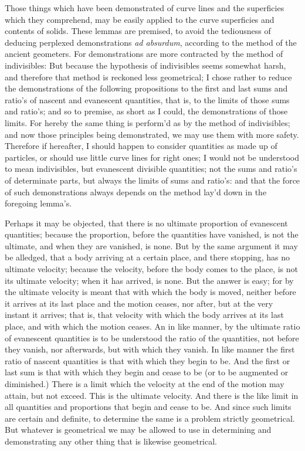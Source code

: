 Those things which have been demonstrated of curve lines and the
superficies which they comprehend, may be easily applied to the
curve superficies and contents of solids.  These lemmas are
premised, to avoid the tediousness of deducing perplexed
demonstrations {\it ad absurdum}, according to the method of the
ancient geometers.  For demonstrations are more contracted by the
method of indivisibles: But because the hypothesis of
indivisibles seems somewhat harsh, and therefore that method is
reckoned less geometrical; I chose rather to reduce the
demonstrations of the following propositions to the first and
last sums and ratio's of nascent and evanescent quantities, that
is, to the limits of those sums and ratio's; and so to premise,
as short as I could, the demonstrations of those limits.  For
hereby the same thing is perform'd as by the method of
indivisibles; and now those principles being demonstrated, we may
use them with more safety.  Therefore if hereafter, I should
happen to consider quantities as made up of particles, or should
use little curve lines for right ones; I would not be understood
to mean indivisibles, but evanescent divisible quantities; not
the sums and ratio's of determinate parts, but always the limits
of sums and ratio's: and that the force of such demonstrations
always depends on the method lay'd down in the foregoing lemma's.

Perhaps it may be objected, that there is no ultimate proportion
of evanescent quantities; because the proportion, before the
quantities have vanished, is not the ultimate, and when they are
vanished, is none.  But by the same argument it may be alledged,
that a body arriving at a certain place, and there stopping, has
no ultimate velocity; because the velocity, before the body comes
to the place, is not its ultimate velocity; when it has arrived,
is none.  But the answer is easy; for by the ultimate velocity is
meant that with which the body is moved, neither before it
arrives at its last place and the motion ceases, nor after, but
at the very instant it arrives; that is, that velocity with which
the body arrives at its last place, and with which the motion
ceases.  An in like manner, by the ultimate ratio of evanescent
quantities is to be understood the ratio of the quantities, not
before they vanish, nor afterwards, but with which they vanish.
In like manner the first ratio of nascent quantities is that with
which they begin to be.  And the first or last sum is that with
which they begin and cease to be (or to be augmented or
diminished.)  There is a limit which the velocity at the end of
the motion may attain, but not exceed.  This is the ultimate
velocity.  And there is the like limit in all quantities and
proportions that begin and cease to be.  And since such limits
are certain and definite, to determine the same is a problem
strictly geometrical.  But whatever is geometrical we may be
allowed to use in determining and demonstrating any other thing
that is likewise geometrical.


